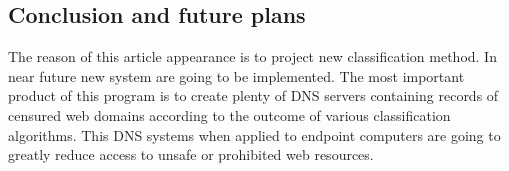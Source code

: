 \documentclass[9pt,a4paper]{extarticle}
\begin{document}
\begin{multicols}{2}
\section{Conclusion and future plans}
The reason of this article appearance is to project new classification method. In near future new system are going to be implemented. The most important product of this program is to create plenty of DNS servers containing records of censured web domains according to the outcome of various classification algorithms. This DNS systems when applied to endpoint computers are going to greatly reduce access to unsafe or prohibited web resources.






\end{multicols}
\end{document}

